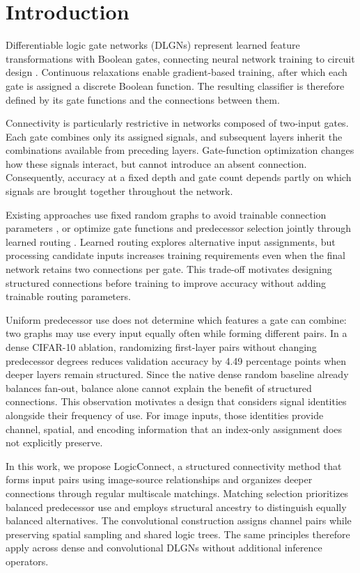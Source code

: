 \section{Introduction}

Differentiable logic gate networks (DLGNs) represent learned feature transformations with Boolean gates, connecting neural network training to circuit design \cite{petersen2022}. Continuous relaxations enable gradient-based training, after which each gate is assigned a discrete Boolean function. The resulting classifier is therefore defined by its gate functions and the connections between them.

Connectivity is particularly restrictive in networks composed of two-input gates. Each gate combines only its assigned signals, and subsequent layers inherit the combinations available from preceding layers. Gate-function optimization changes how these signals interact, but cannot introduce an absent connection. Consequently, accuracy at a fixed depth and gate count depends partly on which signals are brought together throughout the network.

Existing approaches use fixed random graphs to avoid trainable connection parameters \cite{petersen2022,petersen2024}, or optimize gate functions and predecessor selection jointly through learned routing \cite{mommen2025,fojcik2026}. Learned routing explores alternative input assignments, but processing candidate inputs increases training requirements even when the final network retains two connections per gate. This trade-off motivates designing structured connections before training to improve accuracy without adding trainable routing parameters.

Uniform predecessor use does not determine which features a gate can combine: two graphs may use every input equally often while forming different pairs. In a dense CIFAR-10 ablation, randomizing first-layer pairs without changing predecessor degrees reduces validation accuracy by 4.49 percentage points when deeper layers remain structured. Since the native dense random baseline already balances fan-out, balance alone cannot explain the benefit of structured connections. This observation motivates a design that considers signal identities alongside their frequency of use. For image inputs, those identities provide channel, spatial, and encoding information that an index-only assignment does not explicitly preserve.

In this work, we propose LogicConnect, a structured connectivity method that forms input pairs using image-source relationships and organizes deeper connections through regular multiscale matchings. Matching selection prioritizes balanced predecessor use and employs structural ancestry to distinguish equally balanced alternatives. The convolutional construction assigns channel pairs while preserving spatial sampling and shared logic trees. The same principles therefore apply across dense and convolutional DLGNs without additional inference operators.

